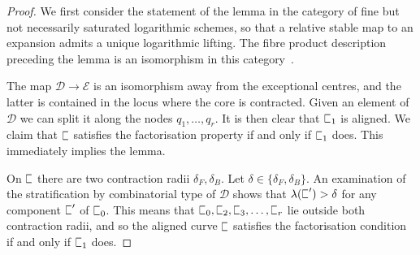 \documentclass[11pt]{amsart}
\newcommand{\sqC}{\scalebox{0.8}[1.3]{$\sqsubset$}}
\newcommand{\PP}{\mathbb P}
\renewcommand{\to}{\rightarrow}
\newcommand{\Dcal}{\mathcal{D}}
\newcommand{\Ecal}{\mathcal{E}}
\theoremstyle{definition}
\newtheorem{lemma}[thm]{Lemma}
\theoremstyle{definition}
\begin{document}
\begin{proof}
We first consider the statement of the lemma in the category of fine but not necessarily saturated logarithmic schemes, so that a relative stable map to an expansion admits a unique logarithmic lifting. The fibre product description preceding the lemma is an isomorphism in this category~\cite[Lemma~4.2.2]{AbramovichMarcusWiseComparison}.

The map $\Dcal\to\Ecal$ is an isomorphism away from the exceptional centres, and the latter is contained in the locus where the core is contracted. Given an element of $\Dcal$ we can split it along the nodes $q_1,\ldots,q_r$. It is then clear that $\sqC_1$ is aligned. We claim that $\sqC$ satisfies the factorisation property if and only if $\sqC_1$ does. This immediately implies the lemma.

On $\sqC$ there are two contraction radii $\delta_F,\delta_B$. Let $\delta \in \{\delta_F,\delta_B\}$. An examination of the stratification by combinatorial type of $\Dcal$ shows that $\lambda(\sqC^\prime) > \delta$ for any component $\sqC^\prime$ of $\sqC_0$. This means that $\sqC_0,\sqC_2,\sqC_3,\ldots,\sqC_r$ lie outside both contraction radii, and so the aligned curve $\sqC$ satisfies the factorisation condition if and only if $\sqC_1$ does. \end{proof}

%
\end{document}
